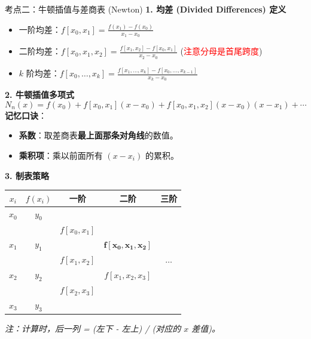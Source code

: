 \documentclass[12pt, a4paper]{article}
\begin{document}
\begin{knowpoint}{考点二：牛顿插值与差商表 (Newton)}
    \textbf{1. 均差 (Divided Differences) 定义}
    \begin{itemize}
        \item 一阶均差：$f[x_0, x_1] = \frac{f(x_1) - f(x_0)}{x_1 - x_0}$
        \item 二阶均差：$f[x_0, x_1, x_2] = \frac{f[x_1, x_2] - f[x_0, x_1]}{x_2 - x_0}$ \quad (\textcolor{red}{注意分母是首尾跨度})
        \item $k$ 阶均差：$f[x_0, \dots, x_k] = \frac{f[x_1, \dots, x_k] - f[x_0, \dots, x_{k-1}]}{x_k - x_0}$
    \end{itemize}

    \textbf{2. 牛顿插值多项式}
    \[ N_n(x) = f(x_0) + f[x_0,x_1](x-x_0) + f[x_0,x_1,x_2](x-x_0)(x-x_1) + \cdots \]
    \textbf{记忆口诀}：
    \begin{itemize}
        \item \textbf{系数}：取差商表\textbf{最上面那条对角线}的数值。
        \item \textbf{乘积项}：乘以前面所有 $(x - x_i)$ 的累积。
    \end{itemize}

    \textbf{3. 制表策略}
    \begin{center}
    \begin{tabular}{c|c|c|c|c}
        $x_i$ & $f(x_i)$ & 一阶 & 二阶 & 三阶 \\ \hline
        $x_0$ & $y_0$ & & & \\
              &       & $f[x_0,x_1]$ & & \\
        $x_1$ & $y_1$ & & $\mathbf{f[x_0,x_1,x_2]}$ & \\
              &       & $f[x_1,x_2]$ & & $\dots$ \\
        $x_2$ & $y_2$ & & $f[x_1,x_2,x_3]$ & \\
              &       & $f[x_2,x_3]$ & & \\
        $x_3$ & $y_3$ & & & 
    \end{tabular}
    \end{center}
    \textit{注：计算时，后一列 = (左下 - 左上) / (对应的 $x$ 差值)。}
\end{knowpoint}
\end{document}
